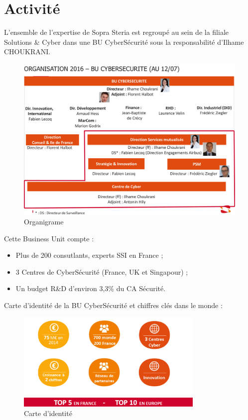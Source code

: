 \documentclass[a4paper]{memoir}
\begin{document}
\newpage

\section*{Activité}

L’ensemble de l’expertise de Sopra Steria est regroupé au sein de la filiale Solutions \& Cyber dans une BU
CyberSécurité sous la responsabilité d’Ilhame CHOUKRANI.

\begin{figure}[!ht]
    \center
    \includegraphics[width=1\textwidth]{./images/sopra4.png}
    \caption{Organigrame}
    \label{Organigrame}
\end{figure}

Cette Business Unit compte : 

\begin{itemize}
\item Plus de 200 consutlants, experts SSI en France ;
\item 3 Centres de CyberSécurité (France, UK et Singapour) ;
\item Un budget R\&D d'environ 3,3\% du CA Sécurité.
\end{itemize}

Carte d’identité de la BU CyberSécurité et chiffres clés dans le monde :

\begin{figure}[!ht]
    \center
    \includegraphics[width=0.8\textwidth]{./images/sopra5.png}
    \caption{Carte d'identité}
    \label{ID}
\end{figure}
\end{document}
